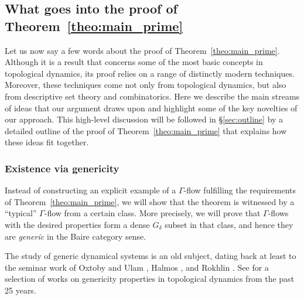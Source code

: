 \documentclass[11pt,reqno,psamsfonts]{amsart}
\theoremstyle{bfnote}
\theoremstyle{definition}
\theoremstyle{remark}
\newcommand{\0}{\varnothing}
\newcommand{\emphd}[1]{{\fontseries{b}\selectfont\textsf{#1}}}
\newcommand{\G}{\Gamma}
\numberwithin{equation}{section}
\begin{document}

    \subsection{What goes into the proof of Theorem~\ref{theo:main_prime}}\label{subsec:tools}

    Let us now say a few words about the proof of Theorem~\ref{theo:main_prime}. Although it is a result that concerns some of the most basic concepts in topological dynamics, its proof relies on a range of distinctly modern techniques. Moreover, these techniques come not only from topological dynamics, but also from descriptive set theory and combinatorics. %
    Here we describe the main streams of ideas that our argument draws upon and highlight some of the key novelties of our approach. 
    This high-level discussion will be followed in \S\ref{sec:outline} by a detailed outline of the proof of Theorem~\ref{theo:main_prime} that explains how these ideas fit together.



    \subsubsection*{Existence via genericity} Instead of constructing an explicit example of a $\G$-flow fulfilling the requirements of Theorem~\ref{theo:main_prime}, we will show that the theorem is witnessed by a ``typical'' $\G$-flow from a certain class. More precisely, we will prove that $\G$-flows with the desired properties form a dense $G_\delta$ subset in that class, and hence they are \emph{generic} in the Baire category sense.
    
    The study of generic dynamical systems is an old subject, dating back at least to the seminar work of Oxtoby and Ulam \cite{OxtobyUlam}, Halmos \cite{Halmos1,Halmos2}, and Rokhlin \cite{Rokhlin}. See \cite{Gen1,Gen2,Gen3,Gen4,Gen5,Gen6,Gen7,Gen8,Gen9} for a selection of works on genericity properties in topological dynamics from the past 25 years. %
        
\end{document}
